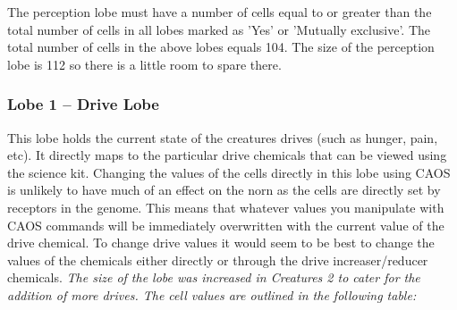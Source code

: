 \documentclass[11pt,twoside,a4paper]{article}
\begin{document}
\clearpage

The perception lobe must have a number of cells equal to or greater than the total number of cells in all lobes marked as 'Yes' or 'Mutually exclusive'. The total number of cells in the above lobes equals 104. The size of the perception lobe is 112 so there is a little room to spare there.

\subsubsection{Lobe 1 -- Drive Lobe}

This lobe holds the current state of the creatures drives (such as hunger, pain, etc). It directly maps to the particular drive chemicals that can be viewed using the science kit. Changing the values of the cells directly in this lobe using CAOS is unlikely to have much of an effect on the norn as the cells are directly set by receptors in the genome. This means that whatever values you manipulate with CAOS commands will be immediately overwritten with the current value of the drive chemical. To change drive values it would seem to be best to change the values of the chemicals either directly or through the drive increaser/reducer chemicals. \emph{The size of the lobe was increased in Creatures 2 to cater for the addition of more drives. The cell values are outlined in the following table:}
\end{document}
